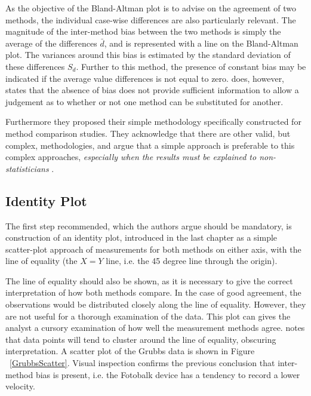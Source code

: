 \documentclass[12pt, a4paper]{report}
\theoremstyle{plain}
\theoremstyle{definition}
\theoremstyle{remark}
\begin{document}
	As the objective of the Bland-Altman plot is to advise on the agreement of two methods, the individual case-wise differences are also particularly relevant.	The magnitude of the inter-method bias between the two methods is simply the average of the differences $\bar{d}$, and is represented with a line on the Bland-Altman plot. The variances around this bias is estimated by the standard deviation of these differences $S_{d}$. Further to this method, the presence of constant bias may be
	indicated if the average value differences is not equal to zero. \citet{BA86} does, however, states that the absence of bias does not provide sufficient information to allow a judgement as to whether or not one method can be substituted for
	another.
	
Furthermore they proposed their simple methodology specifically constructed for method comparison studies. They acknowledge that there are other valid, but complex, methodologies, and argue that
		a simple approach is preferable to this complex approaches,
		\emph{especially when the results must be explained to
			non-statisticians} \citep*{BA83}.
		
		\subsection{Identity Plot}
The first step recommended, which the authors argue should be mandatory, is construction of an identity plot, introduced in the last chapter as a simple scatter-plot approach of measurements for both methods on either axis, with the line of equality (the $X=Y$ line, i.e. the 45 degree line through the origin). 
			
The line of equality should also be shown, as it is necessary to give the correct interpretation of how both methods compare. In the case of good agreement, the observations would be distributed closely along the line of equality. However, they are not useful for a thorough examination of the data. This plot can gives the analyst a cursory examination of how well the measurement methods agree. \citet{BritHypSoc} notes that data points will tend to cluster around the line of equality, obscuring interpretation. A scatter plot of the Grubbs data is shown in Figure ~\ref{GrubbsScatter}. Visual inspection confirms the previous conclusion that inter-method bias is present, i.e. the Fotobalk device has a tendency to record a lower velocity.
	
\end{document}
